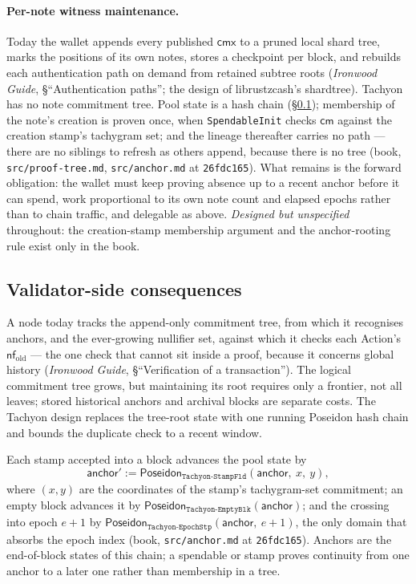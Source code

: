 \documentclass[11pt,a4paper]{article}
\theoremstyle{definition}
\newcommand{\nfsym}{\mathsf{nf}}
\newcommand{\cmsym}{\mathsf{cm}}
\newcommand{\cmx}{\mathsf{cmx}}
\begin{document}
\paragraph{Per-note witness maintenance.} Today the wallet appends every
published $\cmx$ to a pruned local shard tree, marks the positions of its own
notes, stores a checkpoint per block, and rebuilds each authentication path
on demand from retained subtree roots (\emph{Ironwood Guide},
\S``Authentication paths''; the design of
librustzcash's \textsf{shardtree}). Tachyon has no note commitment tree.
Pool state is a hash chain (\S\ref{sec:tachyon-validators}); membership of
the note's creation is proven once, when \texttt{SpendableInit} checks
$\cmsym$ against the creation stamp's tachygram set; and the lineage
thereafter carries no path --- there are no siblings to refresh as others
append, because there is no tree (book, \texttt{src/proof-tree.md},
\texttt{src/anchor.md} at \texttt{26fdc165}). What remains is the forward
obligation: the wallet must keep proving absence up to a recent anchor
before it can spend, work proportional to its own note count and elapsed
epochs rather than to chain traffic, and delegable as above. \emph{Designed
but unspecified} throughout: the creation-stamp membership argument and the
anchor-rooting rule exist only in the book.

\subsection{Validator-side consequences}\label{sec:tachyon-validators}

A node today tracks the append-only commitment tree, from which it
recognises anchors, and the ever-growing nullifier set,
against which it checks each Action's $\nfsym_{\mathrm{old}}$ --- the one
check that cannot sit inside a proof, because it concerns global history
(\emph{Ironwood Guide}, \S``Verification of a transaction''). The logical
commitment tree grows, but maintaining its root requires only a frontier,
not all leaves; stored historical anchors and
archival blocks are separate costs. The Tachyon design replaces the
tree-root state with one running Poseidon hash
chain and bounds the duplicate check to a recent window.

Each stamp accepted into a block advances the pool state by
\[
\mathsf{anchor}' :=
  \mathsf{Poseidon}_{\texttt{Tachyon-StampFld}}(\mathsf{anchor},\ x,\ y),
\]
where $(x, y)$ are the coordinates of the stamp's tachygram-set commitment;
an empty block advances it by
$\mathsf{Poseidon}_{\texttt{Tachyon-EmptyBlk}}(\mathsf{anchor})$; and the
crossing into epoch $e + 1$ by
$\mathsf{Poseidon}_{\texttt{Tachyon-EpochStp}}\allowbreak(\mathsf{anchor},\
e + 1)$,
the only domain that absorbs the epoch index (book, \texttt{src/anchor.md}
at \texttt{26fdc165}). Anchors are the end-of-block states of this chain; a
spendable or stamp proves continuity from one anchor to a later one rather
than membership in a tree.
\end{document}
